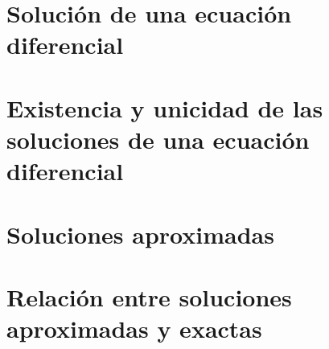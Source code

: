 
\section{Solución de una ecuación diferencial}


\section{Existencia y unicidad de las soluciones de una ecuación diferencial}


\section{Soluciones aproximadas}


\section{Relación entre soluciones aproximadas y exactas}